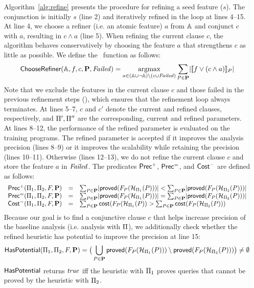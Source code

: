 Algorithm~\ref{alg:refine} presents the procedure for refining a seed
feature ($s$).  The conjunction is initially $s$ (line 2) and
iteratively refined in the loop at lines 4--15. At line 4, we choose a
refiner (i.e. an atomic feature) $a$ from $\mathbb{A}$ and conjunct
$c$ with $a$, resulting in $c\land a$ (line 5).%
 When refining the current clause
$c$, the algorithm behaves conservatively by choosing the feature $a$
that strengthens $c$ as little as possible. We define the
\ChooseAtom~function as follows:
\[
\ChooseAtom(\afeatures, f, c, \vec{P}, \Failed)=
\argmax\limits_{a \in (\afeatures \cup \neg \afeatures) \setminus
	(c\cup \Failed)} \sum\limits_{P \in \vec{P}} \lvert
\sem{f \vee (c \land a)}_P \rvert
\]
Note that we exclude the features in the current clause $c$ and those
failed in the previous refinement steps (\Failed), which ensures that
the refinement loop always terminates.
At lines 5--7, $c$ and $c'$ denote the current and refined clauses,
respectively, and $\Pi',\Pi''$ are the corresponding,
current and refined parameters. At lines 8--12, the performance of
the refined parameter is evaluated on the training programs. The
refined parameter is accepted if it improves the analysis precision
(lines 8--9) or it improves the scalability while retaining the
precision (lines 10--11). Otherwise (lines 12--13), we do not refine
the current clause $c$ and store the feature $a$ in
${\it Failed}$.
The predicates ${\sf Prec^{+}}$, ${\sf Prec^{=}}$, and ${\sf Cost^{-}}$ are defined as follows:
\[
\begin{array}{rcl}
{\sf Prec^{+}}(\Pi_1, \Pi_2, F, \mathbf{P}) &=& \sum_{P \in \mathbf{P}} \lvert{\sf proved}(F_P(\mathcal{H}_{\Pi_1}(P)))\rvert < \sum_{P \in \mathbf{P}}\lvert{\sf proved}(F_P(\mathcal{H}_{\Pi_2}(P)))\rvert\\
{\sf Prec^{=}}(\Pi_1, \Pi_2, F, \mathbf{P}) &=& \sum_{P \in \mathbf{P}} \lvert{\sf proved}(F_P(\mathcal{H}_{\Pi_1}(P)))\rvert = \sum_{P \in \mathbf{P}}\lvert{\sf proved}(F_P(\mathcal{H}_{\Pi_2}(P)))\rvert\\
{\sf Cost^{-}}(\Pi_1, \Pi_2, F, \mathbf{P})&=&\sum_{P \in \mathbf{P}} {\sf cost}(F_P(\mathcal{H}_{\Pi_1}(P)) > \sum_{P \in \mathbf{P}}{\sf cost}(F_P(\mathcal{H}_{\Pi_2}(P)))
\end{array}
\]
Because our goal is to find a conjunctive clause $c$ that helps
increase precision of the baseline analysis (i.e. analysis with
$\Pi$), we additionally check whether the refined heuristic has
potential to improve the precision at line 15:
\[
{\sf HasPotential}(\Pi_1, \Pi_2, F, \mathbf{P}) =\big( \bigcup_{P \in \mathbf{P}}{\sf proved}(F_P(\mathcal{H}_{\Pi_1}(P))) \setminus
                  {\sf proved}(F_P(\mathcal{H}_{\Pi_2}(P)))\big)
                  \neq \emptyset
\]
${\sf HasPotential}$ returns ${\it true}$ iff the heuristic with ${\Pi_1}$ proves
queries that cannot be proved by the heuristic with $\Pi_2$.





